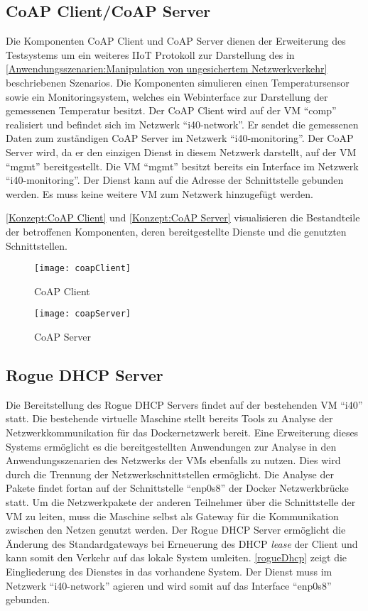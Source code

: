 \subsection{\ac{CoAP} Client/\ac{CoAP} Server}
Die Komponenten \ac{CoAP} Client und \ac{CoAP} Server dienen der Erweiterung des Testsystems um ein weiteres \ac{IIoT} Protokoll zur Darstellung des in \autoref{Anwendungsszenarien:Manipulation von ungesichertem Netzwerkverkehr} beschriebenen Szenarios. Die Komponenten simulieren einen Temperatursensor sowie ein Monitoringsystem, welches ein Webinterface zur Darstellung der gemessenen Temperatur besitzt. Der \ac{CoAP} Client wird auf der \ac{VM} "`comp"' realisiert und befindet sich im Netzwerk "`i40-network"'. Er sendet die gemessenen Daten zum zuständigen \ac{CoAP} Server im Netzwerk "`i40-monitoring"'. Der \ac{CoAP} Server wird, da er den einzigen Dienst in diesem Netzwerk darstellt, auf der \ac{VM} "`mgmt"' bereitgestellt. Die \ac{VM} "`mgmt"' besitzt bereits ein Interface im Netzwerk "`i40-monitoring"'. Der Dienst kann auf die Adresse der Schnittstelle gebunden werden. Es muss keine weitere \ac{VM} zum Netzwerk hinzugefügt werden.

\autoref{Konzept:CoAP Client} und \autoref{Konzept:CoAP Server} visualisieren die Bestandteile der betroffenen Komponenten, deren bereitgestellte Dienste und die genutzten Schnittstellen.

\begin{figure}[h]
  \centering
  \texttt{[image: coapClient]}
  \caption{CoAP Client} 
  \label{Konzept:CoAP Client}
\end{figure}

\begin{figure}[h]
  \centering
  \texttt{[image: coapServer]}
  \caption{CoAP Server} 
  \label{Konzept:CoAP Server}
\end{figure}

\subsection{Rogue \ac{DHCP} Server}
Die Bereitstellung des Rogue \ac{DHCP} Servers findet auf der bestehenden \ac{VM} "`i40"' statt. Die bestehende virtuelle Maschine stellt bereits Tools zu Analyse der Netzwerkkommunikation für das Dockernetzwerk bereit. Eine Erweiterung dieses Systems ermöglicht es die bereitgestellten Anwendungen zur Analyse in den Anwendungsszenarien des Netzwerks der \ac{VM}s ebenfalls zu nutzen. Dies wird durch die Trennung der Netzwerkschnittstellen ermöglicht. Die Analyse der Pakete findet fortan auf der Schnittstelle "`enp0s8"' der Docker Netzwerkbrücke statt. Um die Netzwerkpakete der anderen Teilnehmer über die Schnittstelle der \ac{VM} zu leiten, muss die Maschine selbst als Gateway für die Kommunikation zwischen den Netzen genutzt werden. Der Rogue \ac{DHCP} Server ermöglicht die Änderung des Standardgateways bei Erneuerung des \ac{DHCP} \textit{lease} der Client und kann somit den Verkehr auf das lokale System umleiten. \autoref{rogueDhcp} zeigt die Eingliederung des Dienstes in das vorhandene System. Der Dienst muss im Netzwerk "`i40-network"' agieren und wird somit auf das Interface "`enp0s8"' gebunden.

